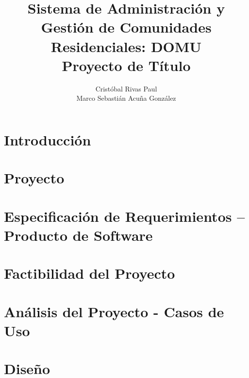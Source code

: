 \documentclass[final,letterpaper,oneside,authoryear,11pt,singlespace,spanish]{ezthesis}
\author{Cristóbal Rivas Paul \\ Marco Sebastián Acuña González}
\title{Sistema de Administración y Gestión de Comunidades Residenciales: DOMU\\Proyecto de Título}
\begin{document}

\cleardoublepage
{}
\setcounter{page}{1}







\renewcommand\contentsname{Índice General}
\tableofcontents

\renewcommand{\listfigurename}{Índice de Figuras}
\listoffigures

\renewcommand{\listtablename}{Índice de Tablas}
\listoftables

\cleardoublepage
{}
\setcounter{page}{1}

\chapter{Introducción}
\label{cap:introduccion}


\chapter{Proyecto}
\label{cap:proyecto}


\chapter{Especificación de Requerimientos – Producto de Software}
\label{cap:requerimientos}


\chapter{Factibilidad del Proyecto}
\label{cap:factibilidad}


\chapter{Análisis del Proyecto - Casos de Uso}
\label{cap:casos}


\chapter{Diseño}
\label{cap:diseno}

\end{document}
